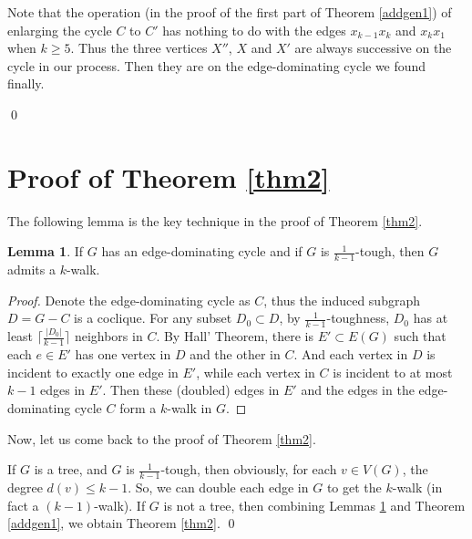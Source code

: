 \documentclass{amsart}
\theoremstyle{definition}
\newtheorem{lemma}{Lemma}
\begin{document}
Note that the operation (in the proof of the first part of Theorem \ref{addgen1}) of enlarging the cycle $C$ to $C'$ has nothing to do with the edges $x_{k-1}x_k$ and $x_kx_1$ when $k\ge5$. Thus the three vertices $X''$, $X$ and $X'$ are always successive on the cycle in our process. Then they are on the edge-dominating cycle we found finally.




















\qed


\section{Proof of Theorem \ref{thm2}}





The following lemma is the key technique in the proof of Theorem \ref{thm2}.

\begin{lemma}\label{addtec}
If $G$ has an edge-dominating cycle and if $G$ is $\frac{1}{k-1}$-tough, then $G$ admits a $k$-walk.
\end{lemma}

\begin{proof}
Denote the edge-dominating cycle as $C$, thus the induced subgraph $D=G-C$ is a coclique. For any subset $D_0\subset D$, by $\frac{1}{k-1}$-toughness, $D_0$ has at least $\lceil\frac{|D_0|}{k-1}\rceil$ neighbors in $C$. By Hall' Theorem, there is $E'\subset E(G)$ such that each $e\in E'$ has one vertex in $D$ and the other in $C$. And each vertex in $D$ is incident to exactly one edge in $E'$, while each vertex in $C$ is incident to at most $k-1$ edges in $E'$. Then these (doubled) edges in $E'$ and the edges in the edge-dominating cycle $C$ form a $k$-walk in $G$.
\end{proof}

Now, let us come back to the proof of Theorem \ref{thm2}.

If $G$ is a tree, and $G$ is $\frac{1}{k-1}$-tough, then obviously, for each $v\in V(G)$, the degree $d(v)\le k-1$. So, we can double each edge in $G$ to get the $k$-walk (in fact a $(k-1)$-walk).
If $G$ is not a tree, then
combining Lemmas \ref{addtec}  and Theorem \ref{addgen1},
we obtain Theorem \ref{thm2}.
\qed
\end{document}
